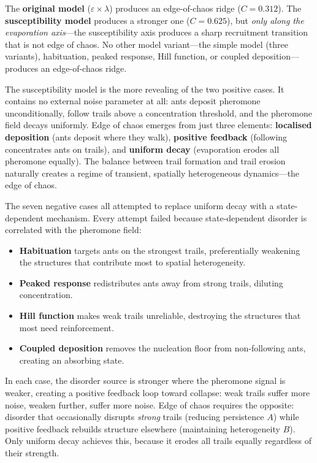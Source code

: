 \documentclass[11pt,a4paper]{article}
\begin{document}
The \textbf{original model} ($\varepsilon \times \lambda$) produces an edge-of-chaos ridge ($C = 0.312$).
The \textbf{susceptibility model} produces a stronger one ($C = 0.625$), but \emph{only along the evaporation axis}---the susceptibility axis produces a sharp recruitment transition that is not edge of chaos.
No other model variant---the simple model (three variants), habituation, peaked response, Hill function, or coupled deposition---produces an edge-of-chaos ridge.

The susceptibility model is the more revealing of the two positive cases.
It contains no external noise parameter at all: ants deposit pheromone unconditionally, follow trails above a concentration threshold, and the pheromone field decays uniformly.
Edge of chaos emerges from just three elements: \textbf{localised deposition} (ants deposit where they walk), \textbf{positive feedback} (following concentrates ants on trails), and \textbf{uniform decay} (evaporation erodes all pheromone equally).
The balance between trail formation and trail erosion naturally creates a regime of transient, spatially heterogeneous dynamics---the edge of chaos.

The seven negative cases all attempted to replace uniform decay with a state-dependent mechanism.
Every attempt failed because state-dependent disorder is correlated with the pheromone field:

\begin{itemize}
  \item \textbf{Habituation} targets ants on the strongest trails, preferentially weakening the structures that contribute most to spatial heterogeneity.
  \item \textbf{Peaked response} redistributes ants away from strong trails, diluting concentration.
  \item \textbf{Hill function} makes weak trails unreliable, destroying the structures that most need reinforcement.
  \item \textbf{Coupled deposition} removes the nucleation floor from non-following ants, creating an absorbing state.
\end{itemize}

In each case, the disorder source is stronger where the pheromone signal is weaker, creating a positive feedback loop toward collapse: weak trails suffer more noise, weaken further, suffer more noise.
Edge of chaos requires the opposite: disorder that occasionally disrupts \emph{strong} trails (reducing persistence $A$) while positive feedback rebuilds structure elsewhere (maintaining heterogeneity $B$).
Only uniform decay achieves this, because it erodes all trails equally regardless of their strength.
\end{document}
